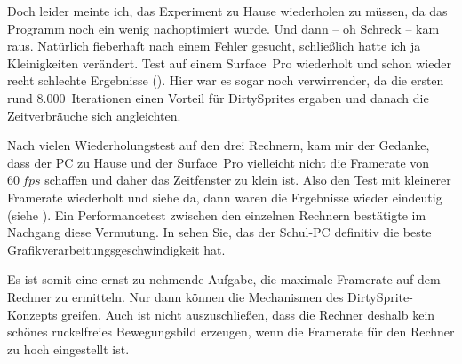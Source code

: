 
Doch leider meinte ich, das Experiment zu Hause wiederholen zu müssen, da das Programm noch ein wenig nachoptimiert wurde. Und dann -- oh Schreck -- kam  raus. Natürlich fieberhaft nach einem Fehler gesucht, schließlich hatte ich ja Kleinigkeiten verändert. Test auf einem Surface~Pro wiederholt und schon wieder recht schlechte Ergebnisse (). Hier war es sogar noch verwirrender, da die ersten rund 8.000~Iterationen einen Vorteil für DirtySprites ergaben und danach die Zeitverbräuche sich angleichten. 

Nach vielen Wiederholungstest auf den drei Rechnern, kam mir der Gedanke, dass der PC zu Hause und der Surface~Pro vielleicht nicht die Framerate von $60~fps$ schaffen und daher das Zeitfenster zu klein ist. Also den Test mit kleinerer Framerate wiederholt und siehe da, dann waren die Ergebnisse wieder eindeutig (siehe ). Ein Performancetest zwischen den einzelnen Rechnern bestätigte im Nachgang diese Vermutung. In  sehen Sie, das der Schul-PC definitiv die beste Grafikverarbeitungsgeschwindigkeit hat.




Es ist somit eine ernst zu nehmende Aufgabe, die maximale Framerate auf dem Rechner zu ermitteln. Nur dann können die Mechanismen des DirtySprite-Konzepts greifen. Auch ist nicht auszuschließen, dass die Rechner deshalb kein schönes ruckelfreies Bewegungsbild erzeugen, wenn die Framerate für den Rechner zu hoch eingestellt ist.

